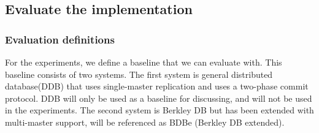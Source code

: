 


\subsection{Evaluate the implementation} 
\label{subsec:experiment}

\subsubsection{Evaluation definitions} %
\label{ssub:evaluation_baseline}

For the experiments, we define a baseline that we can evaluate with. This baseline consists of two systems. The first system is general distributed database(DDB) that uses single-master replication and uses a two-phase commit protocol. DDB will only be used as a baseline for discussing, and will not be used in the experiments. The second system is Berkley DB but has been extended with multi-master support, will be referenced as BDBe (Berkley DB extended). 


